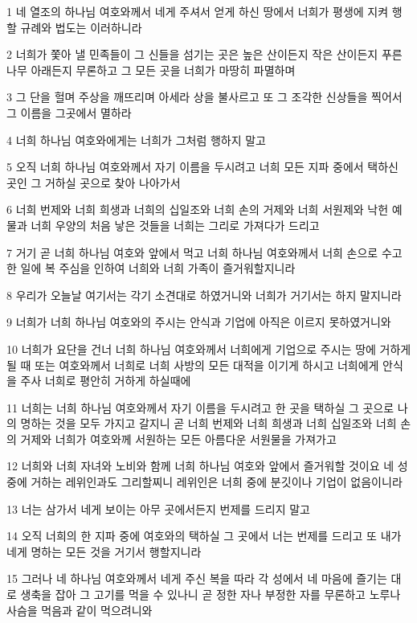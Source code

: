 \par 1 네 열조의 하나님 여호와께서 네게 주셔서 얻게 하신 땅에서 너희가 평생에 지켜 행할 규례와 법도는 이러하니라
\par 2 너희가 쫓아 낼 민족들이 그 신들을 섬기는 곳은 높은 산이든지 작은 산이든지 푸른 나무 아래든지 무론하고 그 모든 곳을 너희가 마땅히 파멸하며
\par 3 그 단을 헐며 주상을 깨뜨리며 아세라 상을 불사르고 또 그 조각한 신상들을 찍어서 그 이름을 그곳에서 멸하라
\par 4 너희 하나님 여호와에게는 너희가 그처럼 행하지 말고
\par 5 오직 너희 하나님 여호와께서 자기 이름을 두시려고 너희 모든 지파 중에서 택하신 곳인 그 거하실 곳으로 찾아 나아가서
\par 6 너희 번제와 너희 희생과 너희의 십일조와 너희 손의 거제와 너희 서원제와 낙헌 예물과 너희 우양의 처음 낳은 것들을 너희는 그리로 가져다가 드리고
\par 7 거기 곧 너희 하나님 여호와 앞에서 먹고 너희 하나님 여호와께서 너희 손으로 수고한 일에 복 주심을 인하여 너희와 너희 가족이 즐거워할지니라
\par 8 우리가 오늘날 여기서는 각기 소견대로 하였거니와 너희가 거기서는 하지 말지니라
\par 9 너희가 너희 하나님 여호와의 주시는 안식과 기업에 아직은 이르지 못하였거니와
\par 10 너희가 요단을 건너 너희 하나님 여호와께서 너희에게 기업으로 주시는 땅에 거하게 될 때 또는 여호와께서 너희로 너희 사방의 모든 대적을 이기게 하시고 너희에게 안식을 주사 너희로 평안히 거하게 하실때에
\par 11 너희는 너희 하나님 여호와께서 자기 이름을 두시려고 한 곳을 택하실 그 곳으로 나의 명하는 것을 모두 가지고 갈지니 곧 너희 번제와 너희 희생과 너희 십일조와 너희 손의 거제와 너희가 여호와께 서원하는 모든 아름다운 서원물을 가져가고
\par 12 너희와 너희 자녀와 노비와 함께 너희 하나님 여호와 앞에서 즐거워할 것이요 네 성중에 거하는 레위인과도 그리할찌니 레위인은 너희 중에 분깃이나 기업이 없음이니라
\par 13 너는 삼가서 네게 보이는 아무 곳에서든지 번제를 드리지 말고
\par 14 오직 너희의 한 지파 중에 여호와의 택하실 그 곳에서 너는 번제를 드리고 또 내가 네게 명하는 모든 것을 거기서 행할지니라
\par 15 그러나 네 하나님 여호와께서 네게 주신 복을 따라 각 성에서 네 마음에 즐기는 대로 생축을 잡아 그 고기를 먹을 수 있나니 곧 정한 자나 부정한 자를 무론하고 노루나 사슴을 먹음과 같이 먹으려니와
